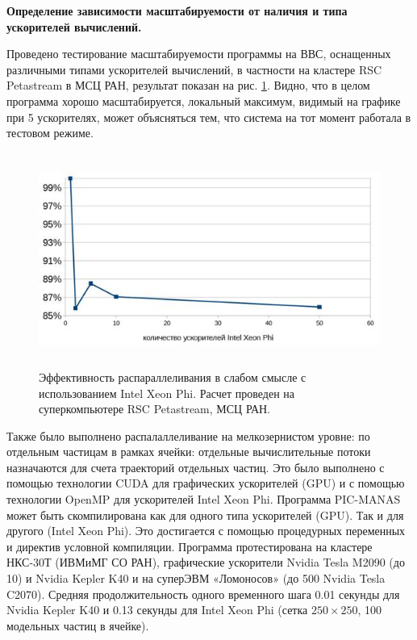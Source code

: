 


\textbf{Определение зависимости масштабируемости от наличия и типа ускорителей вычислений.}

Проведено тестирование масштабируемости программы на ВВС, оснащенных различными типами ускорителей вычислений, в частности на кластере RSC Petastream в МСЦ РАН, результат показан на рис. \ref{phi100}. Видно, что в целом программа хорошо масштабируется, локальный максимум, видимый на графике при 5 ускорителях, может объясняться тем, что система на тот момент работала в тестовом режиме.

\begin{figure}[htb]
	\begin{center}
		\includegraphics[height=7cm,keepaspectratio]{images/petastream_phi100.jpg}
	\end{center}
	\caption{Эффективность распараллеливания в слабом смысле с использованием Intel Xeon Phi. Расчет проведен на суперкомпьютере RSC Petastream, МСЦ РАН.}
	\label{phi100}
\end{figure}

Также было выполнено распалаллеливание на мелкозернистом уровне: по отдельным частицам в рамках ячейки: отдельные вычислительные потоки назначаются для счета траекторий отдельных частиц. Это было выполнено с помощью технологии CUDA для графических ускорителей (GPU) и с помощью технологии OpenMP для ускорителей Intel Xeon Phi. Программа PIC-MANAS может быть скомпилирована как для одного типа ускорителей (GPU). Так и для другого (Intel Xeon Phi). Это достигается с помощью процедурных переменных и директив условной компиляции. Программа протестирована на кластере НКС-30Т (ИВМиМГ СО РАН), графические ускорители Nvidia Tesla M2090 (до 10) и Nvidia Kepler K40 и на суперЭВМ «Ломоносов»  (до 500 Nvidia Tesla C2070). Средняя продолжительность одного временного шага 0.01 секунды для  Nvidia Kepler K40 и 0.13 секунды для  Intel Xeon Phi (сетка $250\times250$, 100 модельных частиц в ячейке).



